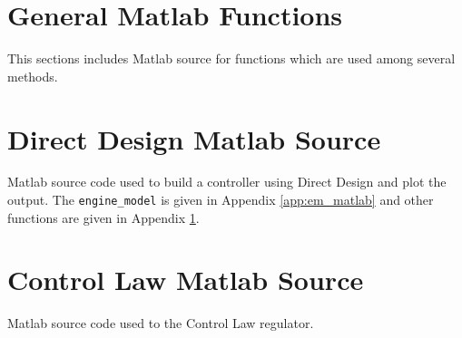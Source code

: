 \documentclass{article}
\begin{document}
\clearpage


\clearpage
\section{General Matlab Functions}
\label{app:gf_matlab}

This sections includes Matlab source for functions which are
used among several methods.





\clearpage



\clearpage
\section{Direct Design Matlab Source}
\label{app:dd_matlab}

Matlab source code used to build a controller using Direct Design
and plot the output.
The \verb+engine_model+ is given in Appendix \ref{app:em_matlab}
and other functions are given in Appendix \ref{app:gf_matlab}.



\clearpage



\clearpage
\section{Control Law Matlab Source}
\label{app:cl_matlab}

Matlab source code used to the Control Law regulator.



\end{document}
